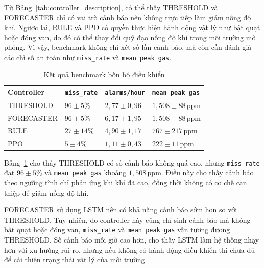 Từ Bảng~\ref{tab:controller_description}, có thể thấy THRESHOLD và FORECASTER chỉ có vai trò cảnh báo nên không trực tiếp làm giảm nồng độ khí. Ngược lại, RULE và PPO có quyền thực hiện hành động vật lý như bật quạt hoặc đóng van, do đó có thể thay đổi quỹ đạo nồng độ khí trong môi trường mô phỏng. Vì vậy, benchmark không chỉ xét số lần cảnh báo, mà còn cần đánh giá các chỉ số an toàn như \texttt{miss\_rate} và \texttt{mean peak gas}.

\begingroup
\small
\renewcommand{\arraystretch}{1.25}
\setlength{\tabcolsep}{4pt}

\begin{longtable}{
  >{\raggedright\arraybackslash}p{2.8cm}
  >{\centering\arraybackslash}p{2.6cm}
  >{\centering\arraybackslash}p{2.8cm}
  >{\centering\arraybackslash}p{3.2cm}
}
\caption{Kết quả benchmark bốn bộ điều khiển}
\label{tab:benchmark_results} \\
\toprule
\textbf{Controller} 
& \textbf{\texttt{miss\_rate}} 
& \textbf{\texttt{alarms/hour}} 
& \textbf{\texttt{mean peak gas}} \\
\midrule
\endfirsthead

\endhead
\endfoot

\bottomrule
\endlastfoot

THRESHOLD  
& $96 \pm 5$\%  
& $2{,}77 \pm 0{,}96$ 
& $1{,}508 \pm 88$\,ppm \\

FORECASTER 
& $96 \pm 5$\%  
& $6{,}17 \pm 1{,}95$ 
& $1{,}508 \pm 88$\,ppm \\

RULE       
& $27 \pm 14$\% 
& $4{,}90 \pm 1{,}17$ 
& $767 \pm 217$\,ppm \\

PPO        
& $5 \pm 4$\%   
& $1{,}11 \pm 0{,}43$ 
& $222 \pm 11$\,ppm \\

\end{longtable}
\endgroup

Bảng~\ref{tab:benchmark_results} cho thấy THRESHOLD có số cảnh báo không quá cao, nhưng \texttt{miss\_rate} đạt $96 \pm 5$\% và \texttt{mean peak gas} khoảng $1{,}508$\,ppm. Điều này cho thấy cảnh báo theo ngưỡng tĩnh chỉ phản ứng khi khí đã cao, đồng thời không có cơ chế can thiệp để giảm nồng độ khí.

FORECASTER sử dụng LSTM nên có khả năng cảnh báo sớm hơn so với THRESHOLD. Tuy nhiên, do controller này cũng chỉ sinh cảnh báo mà không bật quạt hoặc đóng van, \texttt{miss\_rate} và \texttt{mean peak gas} vẫn tương đương THRESHOLD. Số cảnh báo mỗi giờ cao hơn, cho thấy LSTM làm hệ thống nhạy hơn với xu hướng rủi ro, nhưng nếu không có hành động điều khiển thì chưa đủ để cải thiện trạng thái vật lý của môi trường.

